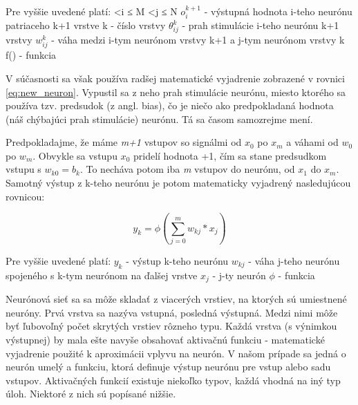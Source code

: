 	Pre vyššie uvedené platí: 
	 \textless i ≤ M
	 \textless j ≤ N
	\newline
	\(o_i^{k+1}\)  - výstupná hodnota i-teho neurónu patriaceho k+1 vrstve 
	\newline
	k - číslo vrstvy
	\newline
	\(\theta_{ij}^{k}\) - prah stimulácie i-teho neurónu k+1 vrstvy
	\newline
	\(w_{ij}^{k}\) - váha medzi i-tym neurónom vrstvy k+1 a j-tym neurónom vrstvy k 
	\newline 
	f() - funkcia
	\newline
	
	V súčasnosti sa však používa radšej matematické vyjadrenie zobrazené v rovnici \ref{eq:new_neuron}. Vypustil sa z neho prah stimulácie neurónu, miesto ktorého sa používa tzv. predsudok (z angl. bias), čo je niečo ako predpokladaná hodnota (náš chýbajúci prah stimulácie) neurónu. Tá sa časom samozrejme mení. 
	
	Predpokladajme, že máme \textit{m+1} vstupov so signálmi od \(x_0\) po \(x_m\) a váhami od \(w_0\) po \(w_m\). Obvykle sa vstupu \(x_0\) pridelí hodnota +1, čím sa stane predsudkom vstupu s \(w_{k0} = b_k\). To necháva potom iba \textit{m} vstupov do neurónu, od \(x_1\) do \(x_m\). Samotný výstup z k-teho neurónu je potom matematicky vyjadrený nasledujúcou rovnicou:
	
	\begin{equation}
		\label{eq:new_neuron}
		y_k = \phi (\sum_{j=0}^{m} w_{kj}*x_j)
	\end{equation}
	
	Pre vyššie uvedené platí:
	\newline
	\(y_k\) - výstup k-teho neurónu
	\newline
	\(w_{kj}\) - váha j-teho neurónu spojeného s k-tym neurónom na ďalšej vrstve
	\newline
	\(x_j\) - j-ty neurón 
	\newline
	\(\phi\) - funkcia
	\newline
	
	Neurónová sieť sa sa môže skladať z viacerých vrstiev, na ktorých sú umiestnené neuróny. Prvá vrstva sa nazýva vstupná, posledná výstupná. Medzi nimi môže byť ľubovoľný počet skrytých vrstiev rôzneho typu. Každá vrstva (s výnimkou výstupnej) by mala ešte navyše obsahovať aktivačnú funkciu - matematické vyjadrenie použité k aproximácii vplyvu na neurón. V našom prípade sa jedná o neurón umelý a funkciu, ktorá definuje výstup neurónu pre vstup alebo sadu vstupov. Aktivačných funkcií existuje niekoľko typov, každá vhodná na iný typ úloh. Niektoré z nich sú popísané nižšie. 
	
